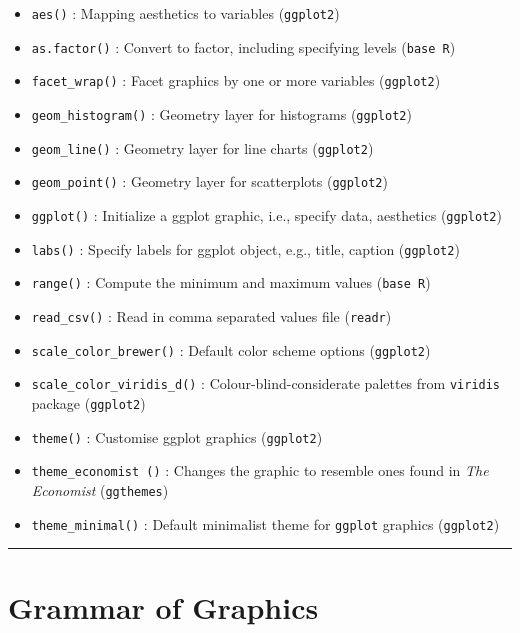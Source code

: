\documentclass[
]{book}
\providecommand{\tightlist}{%
  \setlength{\itemsep}{0pt}\setlength{\parskip}{0pt}}
\begin{document}
\begin{itemize}
\tightlist
\item
  \texttt{aes()} : Mapping aesthetics to variables (\texttt{ggplot2})
\item
  \texttt{as.factor()} : Convert to factor, including specifying levels (\texttt{base\ R})
\item
  \texttt{facet\_wrap()} : Facet graphics by one or more variables (\texttt{ggplot2})
\item
  \texttt{geom\_histogram()} : Geometry layer for histograms (\texttt{ggplot2})
\item
  \texttt{geom\_line()} : Geometry layer for line charts (\texttt{ggplot2})
\item
  \texttt{geom\_point()} : Geometry layer for scatterplots (\texttt{ggplot2})
\item
  \texttt{ggplot()} : Initialize a ggplot graphic, i.e., specify data, aesthetics (\texttt{ggplot2})
\item
  \texttt{labs()} : Specify labels for ggplot object, e.g., title, caption (\texttt{ggplot2})
\item
  \texttt{range()} : Compute the minimum and maximum values (\texttt{base\ R})
\item
  \texttt{read\_csv()} : Read in comma separated values file (\texttt{readr})
\item
  \texttt{scale\_color\_brewer()} : Default color scheme options (\texttt{ggplot2})
\item
  \texttt{scale\_color\_viridis\_d()} : Colour-blind-considerate palettes from \texttt{viridis} package (\texttt{ggplot2})
\item
  \texttt{theme()} : Customise ggplot graphics (\texttt{ggplot2})
\item
  \texttt{theme\_economist\ ()} : Changes the graphic to resemble ones found in \emph{The Economist} (\texttt{ggthemes})
\item
  \texttt{theme\_minimal()} : Default minimalist theme for \texttt{ggplot} graphics (\texttt{ggplot2})
\end{itemize}

\begin{center}\rule{0.5\linewidth}{0.5pt}\end{center}

\hypertarget{grammar-of-graphics}{%
\section{Grammar of Graphics}\label{grammar-of-graphics}}
\end{document}

